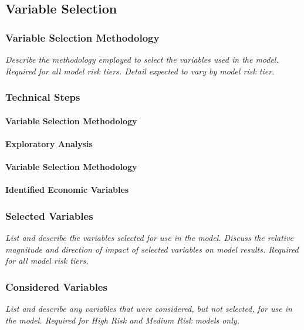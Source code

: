 \documentclass[12pt,letterpaper]{article}
\begin{document}
\subsection{Variable Selection}

\subsubsection{Variable Selection Methodology}
\textit{Describe the methodology employed to select the variables used in the model. Required for all model risk tiers. Detail expected to vary by model risk tier.}

\subsubsection{Technical Steps}

\paragraph{Variable Selection Methodology}

\paragraph{Exploratory Analysis}

\paragraph{Variable Selection Methodology}

\paragraph{Identified Economic Variables}

\subsubsection{Selected Variables}
\textit{List and describe the variables selected for use in the model. Discuss the relative magnitude and direction of impact of selected variables on model results. Required for all model risk tiers.}

\subsubsection{Considered Variables}
\textit{List and describe any variables that were considered, but not selected, for use in the model. Required for High Risk and Medium Risk models only.}
\end{document}
